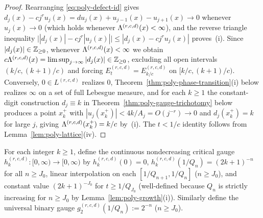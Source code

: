 \begin{proof}
Rearranging \eqref{eq:poly-defect-id} gives
$d_j(x)-cj^ru_j(x)=du_j(x)+u_{j-1}(x)-u_{j+1}(x)\to0$ whenever $u_j(x)\to0$
(which holds whenever $\Lambda^{(r,c,d)}(x)<\infty$), and the reverse triangle
inequality $\bigl||d_j(x)|-cj^r|u_j(x)|\bigr|\le|d_j(x)-cj^ru_j(x)|$ proves~(i).
Since $|d_j(x)|\in\mathbb{Z}_{\ge0}$, whenever $\Lambda^{(r,c,d)}(x)<\infty$ we obtain
$c\Lambda^{(r,c,d)}(x)=\limsup_{j\to\infty}|d_j(x)|\in\mathbb{Z}_{\ge0}$, excluding all
open intervals $(k/c,(k+1)/c)$ and forcing $E_t^{(r,c,d)}=E_{k/c}^{(r,c,d)}$ on
$[k/c,(k+1)/c)$. Conversely, $0\in L^{(r,c,d)}$ realizes $0$,
Theorem~\ref{thm:poly-phase-transition}(i) below realizes $\infty$ on a set of
full Lebesgue measure, and for each $k\ge1$ the constant-digit construction
$d_j\equiv k$ in Theorem~\ref{thm:poly-gauge-trichotomy} below produces a point
$x_k^+$ with $|u_j(x_k^+)|<4k/A_j=O(j^{-r})\to0$ and $d_j(x_k^+)=k$ for large
$j$, giving $\Lambda^{(r,c,d)}(x_k^+)=k/c$ by~(i). The $t<1/c$ identity follows from
Lemma~\ref{lem:poly-lattice}(iv).
\end{proof}

For each integer $k\ge1$, define the continuous nondecreasing critical gauge
$h_k^{(r,c,d)}:[0,\infty)\to[0,\infty)$ by $h_k^{(r,c,d)}(0)=0$,
$h_k^{(r,c,d)}(1/Q_n)=(2k+1)^{-n}$ for all $n\ge J_0$, linear interpolation on
each $[1/Q_{n+1},1/Q_n]$ ($n\ge J_0$), and constant value $(2k+1)^{-J_0}$ for
$t\ge1/Q_{J_0}$ (well-defined because $Q_n$ is strictly increasing for
$n\ge J_0$ by Lemma~\ref{lem:poly-growth}(i)). Similarly define the universal
binary gauge $g_2^{(r,c,d)}(1/Q_n):=2^{-n}$ ($n\ge J_0$).

